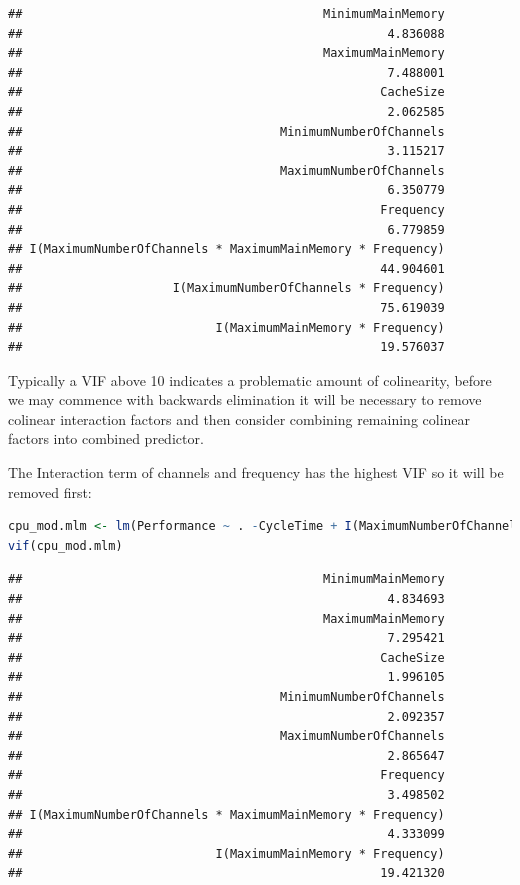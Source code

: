\documentclass[
]{article}
\begin{document}
\begin{lstlisting}
##                                          MinimumMainMemory 
##                                                   4.836088 
##                                          MaximumMainMemory 
##                                                   7.488001 
##                                                  CacheSize 
##                                                   2.062585 
##                                    MinimumNumberOfChannels 
##                                                   3.115217 
##                                    MaximumNumberOfChannels 
##                                                   6.350779 
##                                                  Frequency 
##                                                   6.779859 
## I(MaximumNumberOfChannels * MaximumMainMemory * Frequency) 
##                                                  44.904601 
##                     I(MaximumNumberOfChannels * Frequency) 
##                                                  75.619039 
##                           I(MaximumMainMemory * Frequency) 
##                                                  19.576037
\end{lstlisting}

Typically a VIF above 10 indicates a problematic amount of colinearity,
before we may commence with backwards elimination it will be necessary
to remove colinear interaction factors and then consider combining
remaining colinear factors into combined predictor.

The Interaction term of channels and frequency has the highest VIF so it
will be removed first:

\begin{lstlisting}[language=R]
cpu_mod.mlm <- lm(Performance ~ . -CycleTime + I(MaximumNumberOfChannels * MaximumMainMemory * Frequency) + I( MaximumMainMemory * Frequency)   , data = cpu) 
vif(cpu_mod.mlm)
\end{lstlisting}

\begin{lstlisting}
##                                          MinimumMainMemory 
##                                                   4.834693 
##                                          MaximumMainMemory 
##                                                   7.295421 
##                                                  CacheSize 
##                                                   1.996105 
##                                    MinimumNumberOfChannels 
##                                                   2.092357 
##                                    MaximumNumberOfChannels 
##                                                   2.865647 
##                                                  Frequency 
##                                                   3.498502 
## I(MaximumNumberOfChannels * MaximumMainMemory * Frequency) 
##                                                   4.333099 
##                           I(MaximumMainMemory * Frequency) 
##                                                  19.421320
\end{lstlisting}
\end{document}

